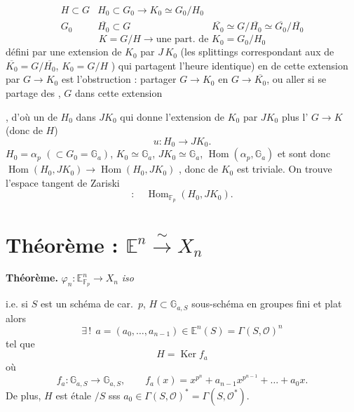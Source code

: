 \documentclass[11pt,a4paper]{article}
\begin{document}
\[
  \begin{array}{lll}
    H \subset G & H_0 \subset G_0 \to K_0 \simeq G_0/H_0 & \\
    G_0 & \overline{H_0} \subset G & \overline{K_0} \simeq G/\overline{H_0} \simeq \overline{G_0}/\overline{H_0}
  \end{array}
\]
\[
  K = G/H \longrightarrow \text{une part.\ de } K_0 = G_0/H_0
\]
défini par une extension de $K_0$ par $J\,K_0$ (les splittings correspondant aux
\ill{} de $\overline{K_0} = G/\overline{H_0}$, $K_0 = G/H$ \struck{\ill{}}) qui partagent
\ill{} l'heure identique)
\ill{} en  de cette extension par $G \to K_0$
est l'obstruction : partager $G \to K_0$
en $G \to \overline{K_0}$, ou aller si se partage des
, \ill{} $G$ dans cette extension

\ill{} , d'où un  de $H_0$ dans $J K_0$ qui
donne l'extension de $K_0$ par $J K_0$ plus l' $G \to K$ \ill{}
(donc  de \ill{} $H$)
\[
  u : H_0 \longrightarrow J K_0 .
\]
 $H_0 = \alpha_p$ $(\subset G_0 = \mathbb{G}_a)$, $K_0 \simeq \mathbb{G}_a$,
$J K_0 \simeq \mathbb{G}_a$, $\operatorname{Hom}(\alpha_p, \mathbb{G}_a)$
et \ill{} sont  
donc $\operatorname{Hom}(H_0, J K_0) \to \operatorname{Hom}(H_0, J K_0)$ ,
donc   de $K_0$ est triviale.
On trouve l'espace tangent de Zariski
\[
  : \quad \operatorname{Hom}_{\mathbb{F}_p}(H_0, J K_0) .
\]

\section*{Théorème : $\mathbb{E}^n \xrightarrow{\ \sim\ } X_n$}

\textbf{Théorème.} $\varphi_n : \mathbb{E}^n_{\mathbb{F}_p} \longrightarrow X_n$
\emph{iso}

i.e. si $S$ est un schéma de car.\ $p$, $H \subset \mathbb{G}_{a,S}$
sous-schéma en groupes fini et plat \struck{\ill{}}
alors
\[
  \exists\,! \ \ a = (a_0, \dots, a_{n-1}) \in \mathbb{E}^n(S) = \Gamma(S, \mathcal{O})^n
\]
tel que
\[
  H = \operatorname{Ker} f_a
\]
où
\[
  f_a : \mathbb{G}_{a,S} \to \mathbb{G}_{a,S}, \qquad
  f_a(x) = x^{p^n} + a_{n-1}x^{p^{n-1}} + \dots + a_0 x .
\]
De plus, $H$ est étale $/S$ sss $a_0 \in \Gamma(S, \mathcal{O})^* = \Gamma(S, \mathcal{O}^*)$.
\end{document}
